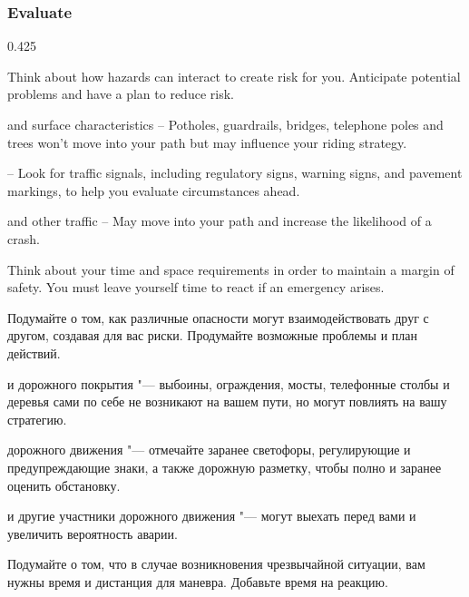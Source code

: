 \subsubsection*{Evaluate}


\begin{langblock}{0.425}
	\begin{eng}
	Think about how hazards can interact to create risk for you. Anticipate potential problems and have a plan to reduce risk.
	
	\begin{description}[noitemsep]
		\item [Road] and surface characteristics – Potholes, guardrails, bridges, telephone poles and trees won't move into your path but may influence your riding strategy.
		\item [Traffic control devices] – Look for traffic signals, including regulatory signs, warning signs, and pavement markings, to help you evaluate circumstances ahead.
		\item [Vehicles] and other traffic – May move into your path and increase the likelihood of a crash.
		
	\end{description}
	Think about your time and space requirements in order to maintain a margin of safety. You must leave yourself time to react if an emergency arises.
	\end{eng}
	\begin{rus}
		Подумайте о том, как различные опасности могут взаимодействовать друг с другом, создавая для вас риски. Продумайте возможные проблемы и план действий.
		
		\begin{description}[noitemsep]
			\item [Качество дороги] и дорожного покрытия "--- выбоины, ограждения, мосты, телефонные столбы и деревья сами по себе не возникают на вашем пути, но могут повлиять на вашу стратегию.
			\item [Средства организации] дорожного движения "--- отмечайте заранее светофоры, регулирующие и предупреждающие знаки, а также дорожную разметку, чтобы полно и заранее оценить обстановку.
			\item [Транспортные средства] и другие участники дорожного движения "--- могут выехать перед вами и увеличить вероятность аварии.
			
		\end{description}
		
		Подумайте о том, что в случае возникновения чрезвычайной ситуации, вам нужны время и дистанция для маневра. Добавьте время на реакцию.
\end{rus}
\end{langblock}




